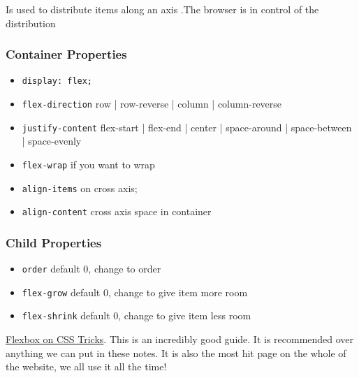 Is used to distribute items along an axis .The browser is in control of the distribution

\subsubsection{Container Properties}

\begin{itemize}
    \item \texttt{display: flex;}
    \item \texttt{flex-direction} row | row-reverse | column | column-reverse
    \item \texttt{justify-content} flex-start | flex-end | center | space-around | space-between | space-evenly
    \item \texttt{flex-wrap} if you want to wrap
    \item \texttt{align-items} on cross axis;
    \item \texttt{align-content} cross axis space in container
\end{itemize}

\subsubsection{Child Properties}

\begin{itemize}
    \item \texttt{order} default 0, change to order
    \item \texttt{flex-grow} default 0, change to give item more room
    \item \texttt{flex-shrink} default 0, change to give item less room
\end{itemize}


\href{https://css-tricks.com/snippets/css/a-guide-to-flexbox/}{Flexbox on CSS Tricks}. This is an incredibly good guide. It is recommended over anything we can put in these notes. It is also the most hit page on the whole of the website, we all use it all the time!
